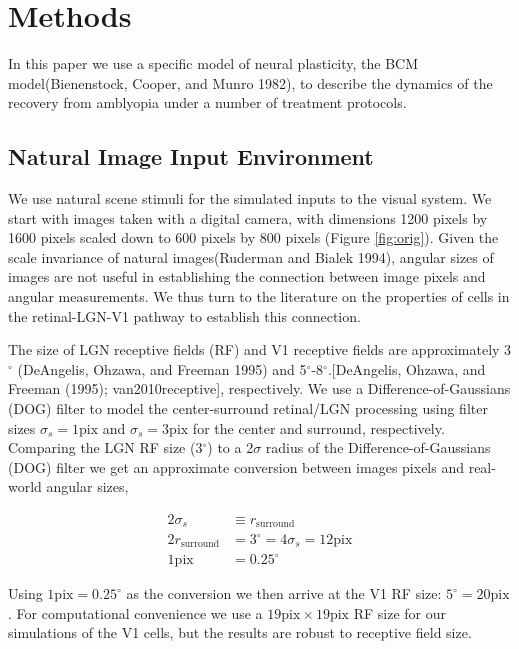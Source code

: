 \documentclass[
  sn-apa,
  pdflatex]{sn-jnl}
\theoremstyle{thmstyleone}%
\theoremstyle{thmstyletwo}%
\theoremstyle{thmstylethree}%
\begin{document}
\hypertarget{methods}{%
\section{Methods}\label{methods}}

In this paper we use a specific model of neural plasticity, the BCM
model(Bienenstock, Cooper, and Munro 1982), to describe the dynamics of
the recovery from amblyopia under a number of treatment protocols.

\hypertarget{natural-image-input-environment}{%
\subsection{Natural Image Input
Environment}\label{natural-image-input-environment}}

We use natural scene stimuli for the simulated inputs to the visual
system. We start with images taken with a digital camera, with
dimensions 1200 pixels by 1600 pixels scaled down to 600 pixels by 800
pixels (Figure \ref{fig:orig}). Given the scale invariance of natural
images(Ruderman and Bialek 1994), angular sizes of images are not useful
in establishing the connection between image pixels and angular
measurements. We thus turn to the literature on the properties of cells
in the retinal-LGN-V1 pathway to establish this connection.

The size of LGN receptive fields (RF) and V1 receptive fields are
approximately 3\(^\circ\) (DeAngelis, Ohzawa, and Freeman 1995) and
5\(^\circ\)-8\(^\circ\).{[}DeAngelis, Ohzawa, and Freeman (1995);
van2010receptive{]}, respectively. We use a Difference-of-Gaussians
(DOG) filter to model the center-surround retinal/LGN processing using
filter sizes \(\sigma_s=1 \text{pix}\) and \(\sigma_s=3 \text{pix}\) for
the center and surround, respectively. Comparing the LGN RF size
(3\(^\circ\)) to a 2\(\sigma\) radius of the Difference-of-Gaussians
(DOG) filter we get an approximate conversion between images pixels and
real-world angular sizes,

\[
\begin{aligned}
2\sigma_s &\equiv r_{\text{surround}} \\
2r_{\text{surround}} &= 3^\circ = 4\sigma_s = 12 \text{pix} \\
1 \text{pix} &= 0.25^\circ
\end{aligned}
\]

Using \(1 \text{pix} = 0.25^\circ\) as the conversion we then arrive at
the V1 RF size: \(5^\circ = 20 \text{pix}\). For computational
convenience we use a \(19 \text{pix}\times 19 \text{pix}\) RF size for
our simulations of the V1 cells, but the results are robust to receptive
field size.
\end{document}
